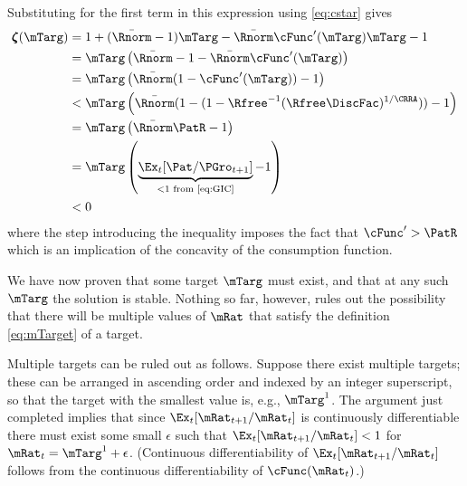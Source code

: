 \documentclass[./BufferStockTheory.tex]{subfiles}
\begin{document}
Substituting for the first term in this expression using
\eqref{eq:cstar} gives
\begin{align*}
\numFunc(\mTarg)  & = 1+(\bar{\Rnorm}-1)\mTarg- \bar{\Rnorm}\cFunc^{\prime}(\mTarg)\mTarg - 1 \\
 & = \mTarg\left(\bar{\Rnorm}-1-\bar{\Rnorm}\cFunc^{\prime}(\mTarg)\right) \\
 & = \mTarg\left(\bar{\Rnorm}(1-\cFunc^{\prime}(\mTarg))-1\right) \\
 & < \mTarg\left(\bar{\Rnorm}(1-(1-{\Rfree}^{-1}(\Rfree\DiscFac)^{1/%
\CRRA}))-1\right) \\
 & = \mTarg\left(\bar{\Rnorm}\PatR-1%
\right) \\
 & = \mTarg\left(\underbrace{\Ex_{t}[{\Pat}/{\PGro}_{t+1}]}_{<
1\text{~from \eqref{eq:GIC}}}-1\right) \\
 & < 0
\end{align*}
where the step introducing the inequality imposes the fact that $\cFunc^{\prime} > \PatR$ which is an
implication of the concavity of the consumption function.

We have now proven that some target $\mTarg$ must exist, and that at any such
$\mTarg$ the solution is stable. Nothing so far, however, rules
out the possibility that there will be multiple values of $\mRat$ that
satisfy the definition \eqref{eq:mTarget} of a target.

Multiple targets can be ruled out as follows. Suppose there exist
multiple targets; these can be arranged in ascending order and indexed
by an integer superscript, so that the target with the smallest value is,
e.g., $\mTarg^{1}$. The argument just completed implies that since
$\Ex_{t}[{\mRat}_{t+1}/\mRat_{t}]$ is continuously differentiable
there must exist some small $\epsilon$ such that
$\Ex_{t}[{\mRat}_{t+1}/\mRat_{t}] < 1$ for $\mRat_{t} =
\mTarg^{1}+\epsilon$. (Continuous differentiability of
$\Ex_{t}[{\mRat}_{t+1}/\mRat_{t}]$ follows from the continuous
differentiability of $\cFunc(\mRat_{t})$.) 
\end{document}
